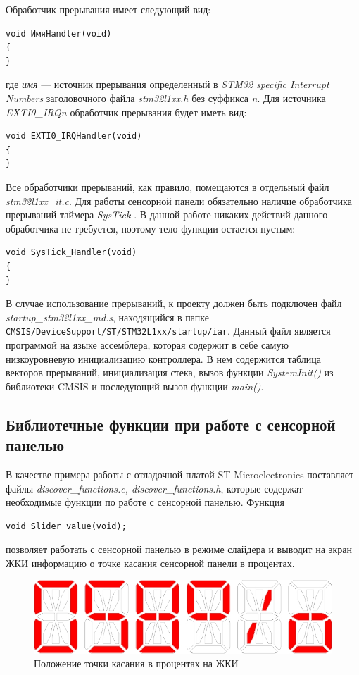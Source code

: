 Обработчик прерывания имеет следующий вид:
\begin{verbatim}
void ИмяHandler(void)
{
}
\end{verbatim}
где \textit{имя} --- источник прерывания определенный в  \textit{STM32 specific Interrupt Numbers} заголовочного файла  \textit{stm32l1xx.h} без суффикса  \textit{n}. Для источника  \textit{EXTI0\_IRQn} обработчик прерывания будет иметь вид:
\begin{verbatim}
void EXTI0_IRQHandler(void)
{
}
\end{verbatim}
Все обработчики прерываний, как правило, помещаются в отдельный файл \textit{stm32l1xx\_it.c}. Для работы сенсорной панели обязательно наличие обработчика прерываний таймера \textit{SysTick} \cite{systic}. В данной работе никаких действий данного обработчика не требуется, поэтому тело функции остается пустым:
\begin{verbatim}
void SysTick_Handler(void)
{
}
\end{verbatim}

В случае использование прерываний, к проекту должен быть подключен файл \textit{startup\_stm32l1xx\_md.s}, находящийся в папке \verb#CMSIS/DeviceSupport/ST/STM32L1xx/startup/iar#. Данный файл является программой на языке ассемблера, которая содержит в себе самую низкоуровневую инициализацию контроллера. В нем содержится таблица векторов прерываний, инициализация стека, вызов функции \textit{SystemInit()} из библиотеки CMSIS и последующий вызов функции \textit{main()}.

\subsection{Библиотечные функции при работе с сенсорной панелью}

В качестве примера работы с отладочной платой ST Microelectronics поставляет файлы \textit{discover\_functions.c, discover\_functions.h}, которые содержат необходимые функции по работе с сенсорной панелью. Функция
\begin{verbatim}
void Slider_value(void);
\end{verbatim}
позволяет работать с сенсорной панелью в режиме слайдера и выводит на экран ЖКИ информацию о точке касания сенсорной панели в процентах.
\begin{figure}[H]
\begin{center}
\includegraphics[scale=0.25]{Image/72.jpg} 
\end{center}
\caption{Положение точки касания в процентах на ЖКИ}
\end{figure}


